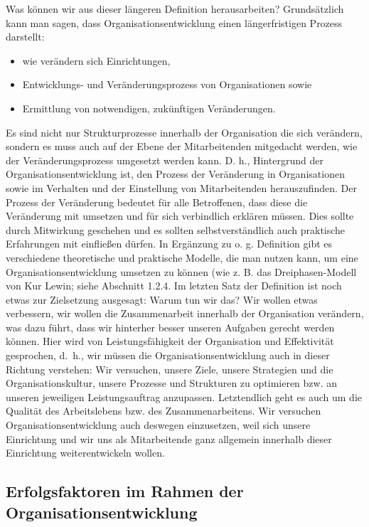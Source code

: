 \documentclass[
  letterpaper,
]{book}
\begin{document}
Was können wir aus dieser längeren Definition herausarbeiten?
Grundsätzlich kann man sagen, dass Organisationsentwicklung einen
längerfristigen Prozess darstellt:

\begin{itemize}
\item
  wie verändern sich Einrichtungen,
\item
  Entwicklungs- und Veränderungsprozess von Organisationen sowie
\item
  Ermittlung von notwendigen, zukünftigen Veränderungen.
\end{itemize}

Es sind nicht nur Strukturprozesse innerhalb der Organisation die sich
verändern, sondern es muss auch auf der Ebene der Mitarbeitenden
mitgedacht werden, wie der Veränderungsprozess umgesetzt werden kann. D.
h., Hintergrund der Organisationsentwicklung ist, den Prozess der
Veränderung in Organisationen sowie im Verhalten und der Einstellung von
Mitarbeitenden herauszufinden. Der Prozess der Veränderung bedeutet für
alle Betroffenen, dass diese die Veränderung mit umsetzen und für sich
verbindlich erklären müssen. Dies sollte durch Mitwirkung geschehen und
es sollten selbstverständlich auch praktische Erfahrungen mit einfließen
dürfen. In Ergänzung zu o. g. Definition gibt es verschiedene
theoretische und praktische Modelle, die man nutzen kann, um eine
Organisationsentwicklung umsetzen zu können (wie z. B. das
Dreiphasen-Modell von Kur Lewin; siehe Abschnitt 1.2.4. Im letzten Satz
der Definition ist noch etwas zur Zielsetzung ausgesagt: Warum tun wir
das? Wir wollen etwas verbessern, wir wollen die Zusammenarbeit
innerhalb der Organisation verändern, was dazu führt, dass wir hinterher
besser unseren Aufgaben gerecht werden können. Hier wird von
Leistungsfähigkeit der Organisation und Effektivität gesprochen, d.~h.,
wir müssen die Organisationsentwicklung auch in dieser Richtung
verstehen: Wir versuchen, unsere Ziele, unsere Strategien und die
Organisationskultur, unsere Prozesse und Strukturen zu optimieren bzw.
an unseren jeweiligen Leistungsauftrag anzupassen. Letztendlich geht es
auch um die Qualität des Arbeitslebens bzw. des Zusammenarbeitens. Wir
versuchen Organisationsentwicklung auch deswegen einzusetzen, weil sich
unsere Einrichtung und wir uns als Mitarbeitende ganz allgemein
innerhalb dieser Einrichtung weiterentwickeln wollen.

\subsection{Erfolgsfaktoren im Rahmen der
Organisationsentwicklung}\label{erfolgsfaktoren-im-rahmen-der-organisationsentwicklung}
\end{document}
